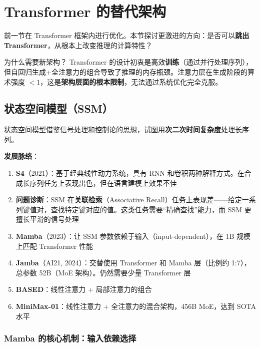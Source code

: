 \section{Transformer 的替代架构}

前一节在 Transformer 框架内进行优化。本节探讨更激进的方向：是否可以\textbf{跳出 Transformer}，从根本上改变推理的计算特性？

\begin{knowledgebox}{为什么需要新架构？}
Transformer 的设计初衷是高效\textbf{训练}（通过并行处理序列），但自回归生成+全注意力的组合导致了推理的内存瓶颈。注意力层在生成阶段的算术强度 $< 1$，这是\textbf{架构层面的根本限制}，无法通过系统优化完全克服。
\end{knowledgebox}

\subsection{状态空间模型（SSM）}

状态空间模型借鉴信号处理和控制论的思想，试图用\textbf{次二次时间复杂度}处理长序列。

\textbf{发展脉络}：

\begin{enumerate}
    \item \textbf{S4}（2021）：基于经典线性动力系统，具有 RNN 和卷积两种解释方式。在合成长序列任务上表现出色，但在语言建模上效果不佳

    \item \textbf{问题诊断}：SSM 在\textbf{关联检索}（Associative Recall）任务上表现差——给定一系列键值对，查找特定键对应的值。这类任务需要``精确查找''能力，而 SSM 更擅长平滑的信号处理

    \item \textbf{Mamba}（2023）：让 SSM 参数依赖于输入（input-dependent），在 1B 规模上匹配 Transformer 性能

    \item \textbf{Jamba}（AI21, 2024）：交替使用 Transformer 和 Mamba 层（比例约 1:7），总参数 52B（MoE 架构）。仍然需要少量 Transformer 层

    \item \textbf{BASED}：线性注意力 + 局部注意力的组合

    \item \textbf{MiniMax-01}：线性注意力 + 全注意力的混合架构，456B MoE，达到 SOTA 水平
\end{enumerate}

\subsubsection{Mamba 的核心机制：输入依赖选择}

